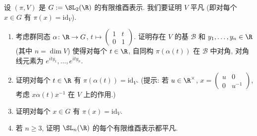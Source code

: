 \begin{exercise}[$\SL_2(\R)$ 的有限维酉表示平凡]
\label{ex:I.5.5.2}
设 $(\pi, V)$ 是 $G := \SL_2(\R)$ 的有限维酉表示. 我们要证明 $V$ 平凡 (即对每个 $x \in G$ 有 $\pi(x) = \mathrm{id}_V$).
\begin{enumerate}
\item[(a)] 考虑群同态 $\alpha \colon \R \to G$, $t \longmapsto \begin{pmatrix} 1 & t \\ 0 & 1 \end{pmatrix}$. 证明存在 $V$ 的基 $\mathcal{B}$ 和 $y_1, \ldots, y_n \in \R$ (其中 $n = \dim V$) 使得对每个 $t \in \R$, 自同构 $\pi(\alpha(t))$ 在 $\mathcal{B}$ 中对角, 对角线元素为 $e^{ity_1}, \ldots, e^{ity_n}$.
\item[(b)] 证明对每个 $t \in \R$ 有 $\pi(\alpha(t)) = \mathrm{id}_V$. (提示: 若 $u \in \R^{\times}$, $x = \begin{pmatrix} u & 0 \\ 0 & u^{-1} \end{pmatrix}$, 考虑 $x\alpha(t)x^{-1}$ 在 $V$ 上的作用.)
\item[(c)] 证明对每个 $x \in G$ 有 $\pi(x) = \mathrm{id}_V$.
\item[(d)] 若 $n \geq 3$, 证明 $\SL_n(\R)$ 的每个有限维酉表示都平凡.
\end{enumerate}
\end{exercise}


